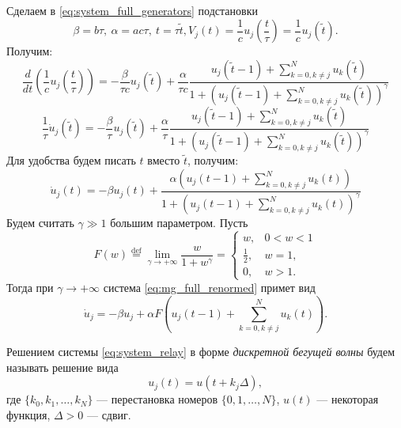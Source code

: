 Сделаем в \eqref{eq:system_full_generators} подстановки
%
\begin{equation}
	\label{eq:mg_norm}
	\beta = b \tau, \ \alpha = ac \tau, \ t = \tau \tilde{t}, V_j(t) = \dfrac{1}{c}u_j\left(\dfrac{t}{\tau}\right) = \dfrac{1}{c}u_j(\tilde{t}).
\end{equation}
%
Получим:
%
\begin{equation*}
	\frac{d}{dt} \left(\dfrac{1}{c}u_j\left(\dfrac{t}{\tau}\right)\right)= -\dfrac{\beta}{\tau c}u_j(\tilde{t}) + \dfrac{\alpha}{\tau c}\dfrac{u_j(\tilde{t} - 1) + \sum\limits_{k = 0, k\neq j}^N u_k(\tilde{t})}{1 + \left(u_j(\tilde{t} - 1) + \sum\limits_{k = 0, k\neq j}^N u_k(\tilde{t})\right)^{\gamma}}
\end{equation*}
%
\begin{equation*}
	\frac{1}{\tau} \dot{u}_j(\tilde{t}) = -\dfrac{\beta}{\tau}u_j(\tilde{t}) + \dfrac{\alpha}{\tau}\dfrac{u_j(\tilde{t} - 1) + \sum\limits_{k = 0, k\neq j}^N u_k(\tilde{t})}{1 + \left(u_j(\tilde{t} - 1) + \sum\limits_{k = 0, k\neq j}^N u_k(\tilde{t})\right)^{\gamma}}
\end{equation*}
%
Для удобства будем писать $t$ вместо $\tilde{t}$, получим:
%
\begin{equation}
	\label{eq:mg_full_renormed}
	\dot{u}_j(t) = -\beta u_j(t) + \dfrac{\alpha \left(u_j(t - 1) + \sum\limits_{k = 0, k\neq j}^N u_k(t)\right)}{1 + \left(u_j(t - 1) + \sum\limits_{k = 0, k\neq j}^N u_k(t)\right)^{\gamma}}
\end{equation}
%
Будем считать $\gamma \gg 1$ большим параметром. Пусть 
%
\begin{equation}
\label{eq:relay_function_F}
F(w)\stackrel{\text{def}}{=}\lim\limits_{\gamma\rightarrow+\infty} \frac{w}{1+w^\gamma}=\left\lbrace\begin{array}{cl}
	w, & 0<w<1 \\
	\frac{1}{2}, & w=1, \\
	0, & w>1.
\end{array}\right.
\end{equation}
%
Тогда при $\gamma \to +\infty$ система \eqref{eq:mg_full_renormed} примет вид
%
\begin{equation}
\label{eq:system_relay}
\dot{u}_j=-\beta u_j+\alpha F\left(u_j(t-1)+\sum\limits_{k=0, k\neq j}^{N} u_{k}(t)\right).
\end{equation}

Решением системы \eqref{eq:system_relay} в форме \emph{дискретной бегущей волны} будем называть решение вида
%
\begin{equation}
	\label{eq:discrete_wave}
	u_j(t) = u(t + k_j\Delta),   
\end{equation}
где $\{k_0, k_1, \ldots, k_N\}$ --- перестановка номеров $\{0, 1, \ldots, N\}$, $u(t)$ --- некоторая функция, $\Delta > 0$ --- сдвиг.

